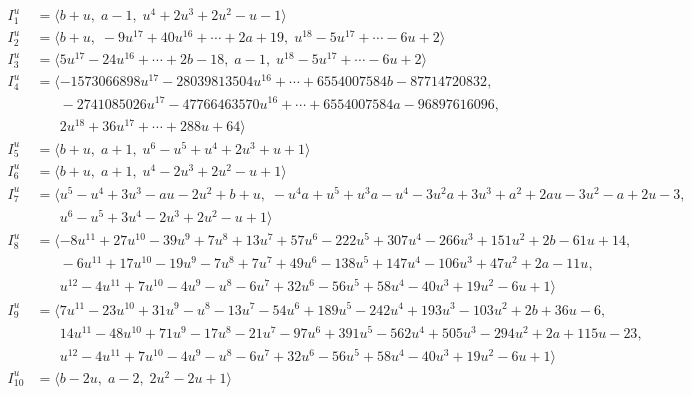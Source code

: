 \documentclass[1p]{elsarticle_modified}
\theoremstyle{definition}
\begin{document}
\begin{align*}
I^u_{1}&=\langle 
b+u,\;a-1,\;u^4+2 u^3+2 u^2- u-1\rangle \\
I^u_{2}&=\langle 
b+u,\;-9 u^{17}+40 u^{16}+\cdots+2 a+19,\;u^{18}-5 u^{17}+\cdots-6 u+2\rangle \\
I^u_{3}&=\langle 
5 u^{17}-24 u^{16}+\cdots+2 b-18,\;a-1,\;u^{18}-5 u^{17}+\cdots-6 u+2\rangle \\
I^u_{4}&=\langle 
-1573066898 u^{17}-28039813504 u^{16}+\cdots+6554007584 b-87714720832,\\
\phantom{I^u_{4}}&\phantom{= \langle  }-2741085026 u^{17}-47766463570 u^{16}+\cdots+6554007584 a-96897616096,\\
\phantom{I^u_{4}}&\phantom{= \langle  }2 u^{18}+36 u^{17}+\cdots+288 u+64\rangle \\
I^u_{5}&=\langle 
b+u,\;a+1,\;u^6- u^5+u^4+2 u^3+u+1\rangle \\
I^u_{6}&=\langle 
b+u,\;a+1,\;u^4-2 u^3+2 u^2- u+1\rangle \\
I^u_{7}&=\langle 
u^5- u^4+3 u^3- a u-2 u^2+b+u,\;- u^4 a+u^5+u^3 a- u^4-3 u^2 a+3 u^3+a^2+2 a u-3 u^2- a+2 u-3,\\
\phantom{I^u_{7}}&\phantom{= \langle  }u^6- u^5+3 u^4-2 u^3+2 u^2- u+1\rangle \\
I^u_{8}&=\langle 
-8 u^{11}+27 u^{10}-39 u^9+7 u^8+13 u^7+57 u^6-222 u^5+307 u^4-266 u^3+151 u^2+2 b-61 u+14,\\
\phantom{I^u_{8}}&\phantom{= \langle  }-6 u^{11}+17 u^{10}-19 u^9-7 u^8+7 u^7+49 u^6-138 u^5+147 u^4-106 u^3+47 u^2+2 a-11 u,\\
\phantom{I^u_{8}}&\phantom{= \langle  }u^{12}-4 u^{11}+7 u^{10}-4 u^9- u^8-6 u^7+32 u^6-56 u^5+58 u^4-40 u^3+19 u^2-6 u+1\rangle \\
I^u_{9}&=\langle 
7 u^{11}-23 u^{10}+31 u^9- u^8-13 u^7-54 u^6+189 u^5-242 u^4+193 u^3-103 u^2+2 b+36 u-6,\\
\phantom{I^u_{9}}&\phantom{= \langle  }14 u^{11}-48 u^{10}+71 u^9-17 u^8-21 u^7-97 u^6+391 u^5-562 u^4+505 u^3-294 u^2+2 a+115 u-23,\\
\phantom{I^u_{9}}&\phantom{= \langle  }u^{12}-4 u^{11}+7 u^{10}-4 u^9- u^8-6 u^7+32 u^6-56 u^5+58 u^4-40 u^3+19 u^2-6 u+1\rangle \\
I^u_{10}&=\langle 
b-2 u,\;a-2,\;2 u^2-2 u+1\rangle \\
\end{align*}\\
\end{document}
